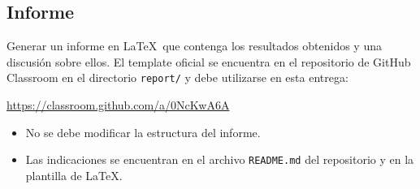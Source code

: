 \subsection{Informe} \label{subsec:report}

Generar un informe en \LaTeX\ que contenga los resultados obtenidos y una discusión sobre ellos.  
El template oficial se encuentra en el repositorio de GitHub Classroom en el directorio \texttt{report/} y debe utilizarse en esta entrega:

\begin{mdframed}
\begin{center}
    \url{https://classroom.github.com/a/0NcKwA6A}
\end{center}
\end{mdframed}

\begin{itemize}
    \item No se debe modificar la estructura del informe.
    \item Las indicaciones se encuentran en el archivo \texttt{README.md} del repositorio y en la plantilla de \LaTeX.
\end{itemize}
